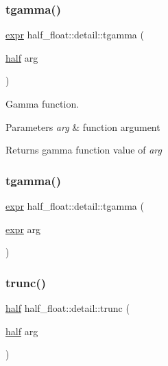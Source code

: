 \subsubsection{\texorpdfstring{tgamma()}{tgamma()}\hspace{0.1cm}{\footnotesize\ttfamily [1/2]}}
{\footnotesize\ttfamily \hyperlink{structhalf__float_1_1detail_1_1expr}{expr} half\+\_\+float\+::detail\+::tgamma (\begin{DoxyParamCaption}\item[{\hyperlink{classhalf__float_1_1half}{half}}]{arg }\end{DoxyParamCaption})\hspace{0.3cm}{\ttfamily [inline]}}

Gamma function. 
\begin{DoxyParams}{Parameters}
{\em arg} & function argument \\
\hline
\end{DoxyParams}
\begin{DoxyReturn}{Returns}
gamma function value of {\itshape arg} 
\end{DoxyReturn}
\mbox{\label{namespacehalf__float_1_1detail_aa9767c4f2cb1260978d67745b8533882}} 
\subsubsection{\texorpdfstring{tgamma()}{tgamma()}\hspace{0.1cm}{\footnotesize\ttfamily [2/2]}}
{\footnotesize\ttfamily \hyperlink{structhalf__float_1_1detail_1_1expr}{expr} half\+\_\+float\+::detail\+::tgamma (\begin{DoxyParamCaption}\item[{\hyperlink{structhalf__float_1_1detail_1_1expr}{expr}}]{arg }\end{DoxyParamCaption})\hspace{0.3cm}{\ttfamily [inline]}}

\mbox{\label{namespacehalf__float_1_1detail_ad2f636a625c44e0e2e939cf4fcdd8980}} 
\subsubsection{\texorpdfstring{trunc()}{trunc()}\hspace{0.1cm}{\footnotesize\ttfamily [1/2]}}
{\footnotesize\ttfamily \hyperlink{classhalf__float_1_1half}{half} half\+\_\+float\+::detail\+::trunc (\begin{DoxyParamCaption}\item[{\hyperlink{classhalf__float_1_1half}{half}}]{arg }\end{DoxyParamCaption})\hspace{0.3cm}{\ttfamily [inline]}}

